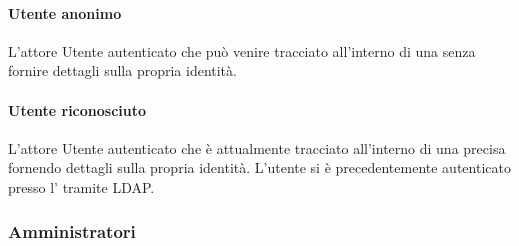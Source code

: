\paragraph{Utente anonimo}
L'attore Utente autenticato che può venire tracciato all'interno di una  senza fornire dettagli sulla propria identità.
\paragraph{Utente riconosciuto}
L'attore Utente autenticato che è attualmente tracciato all'interno di una precisa  fornendo dettagli sulla propria identità.
L'utente si è precedentemente autenticato presso l' tramite LDAP.

\subsubsection{Amministratori}
